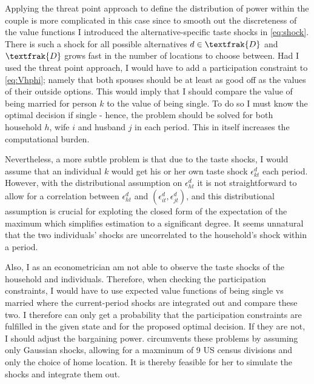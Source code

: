 Applying the threat point approach to define the distribution of power within the couple is more complicated in this case since to smooth out the discreteness of the value functions I introduced the alternative-specific taste shocks in \eqref{eq:shock}. There is such a shock for all possible alternatives $d \in \textfrak{D}$ and $\textfrak{D}$ grows fast in the number of locations to choose between. Had I used the threat point approach, I would have to add a participation constraint to \eqref{eq:Vhphi}; namely that both spouses should be at least as good off as the values of their outside options. This would imply that I should compare the value of being married for person $k$ to the value of being single. To do so I must know the optimal decision if single - hence, the problem should be solved for both household $h$, wife $i$ and husband $j$ in each period. This in itself increases the computational burden. 

Nevertheless, a more subtle problem is that due to the taste shocks, I would assume that an individual $k$ would get his or her own taste shock $\epsilon_{kt}^d$ each period. However, with the distributional assumption on $\epsilon_{ht}^d$ it is not straightforward to allow for a correlation between $\epsilon_{ht}^d$ and $(\epsilon_{it}^d,\epsilon_{jt}^d)$, and this distributional assumption is crucial for exploting the closed form of the expectation of the maximum which simplifies estimation to a significant degree. It seems unnatural that the two individuals' shocks are uncorrelated to the household's shock within a period. 

Also, I as an econometrician am not able to observe the taste shocks of the household and individuals. Therefore, when checking the participation constraints, I would have to use expected value functions of being single vs married where the current-period shocks are integrated out and compare these two. I therefore can only get a probability that the participation constraints are fulfilled in the given state and for the proposed optimal decision. If they are not, I should adjust the bargaining power. \cite{Gemici2011} circumvents these problems by assuming only Gaussian shocks, allowing for a maxminum of 9 US census divisions and only the choice of home location. It is thereby feasible for her to simulate the shocks and integrate them out.

